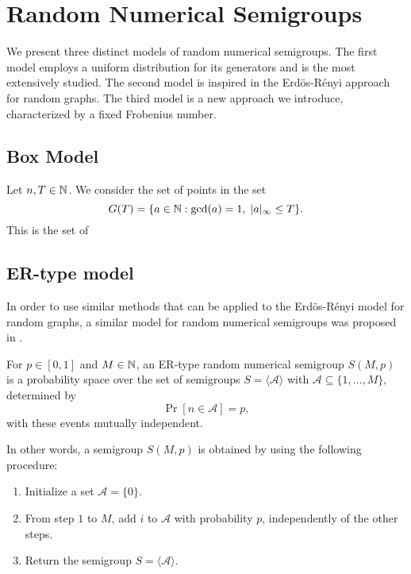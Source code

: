 
\chapter{Random Numerical Semigroups}\label{chap:randnumsems}

We present three distinct models of random numerical semigroups. The first model employs a uniform distribution for its generators and is the most extensively studied. The second model is inspired in the Erdös-Rényi approach for random graphs. The third model is a new approach we introduce, characterized by a fixed Frobenius number.

\section{Box Model}\label{sec:randomsmpgs:intro}

Let $n, T \in \mathbb{N}$. We consider the set of points in the set
\[G(T) = \{a \in \mathbb{N} : \mathrm{gcd}(a) = 1, \; |a|_\infty \leq T\}.\]
This is the set of 



\section{ER-type model}

In order to use similar methods that can be applied to the Erdös-Rényi model for random graphs, a similar model for random numerical semigroups was proposed in \cite{de2018random}. 

\begin{definition}
    For $p \in [0, 1]$ and $M \in \mathbb{N}$, an ER-type random numerical semigroup $S(M, p)$ is a probability space over the set of semigroups $S = \langle\mathcal{A}\rangle$ with $\mathcal{A} \subseteq \{1,...,M\}$, determined by
    \[\Pr[n \in \mathcal{A}] = p,\]
    with these events mutually independent.
\end{definition}

In other words, a semigroup $S(M, p)$ is obtained by using the following procedure:
\begin{enumerate}
    \item Initialize a set $\mathcal{A} = \{0\}$.
    \item From step $1$ to $M$, add $i$ to $\mathcal{A}$ with probability $p$, independently of the other steps.
    \item Return the semigroup $S = \langle\mathcal{A}\rangle$.
\end{enumerate}

